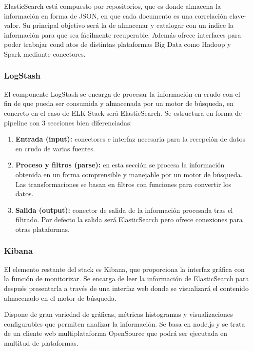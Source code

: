 ElasticSearch está compuesto por repositorios, que es donde almacena la información en forma de JSON, en que cada documento es una correlación clave-valor. Su principal objetivo será la de almacenar y catalogar con un índice la información para que sea fácilmente recuperable. Además ofrece interfaces para poder trabajar cond atos de distintas plataformas Big Data como Hadoop y Spark mediante conectores.

\subsubsection{LogStash}

El componente LogStash  se encarga de procesar la información en crudo con el fin de que pueda ser consumida y almacenada por un motor de búsqueda, en concreto en el caso de ELK Stack será ElasticSearch. Se estructura en forma de pipeline con 3 secciones bien diferenciadas:

\begin{enumerate}
\item \textbf{Entrada (input):} conectores e interfaz necesaria para la recepción de datos en crudo de varias fuentes.
\item \textbf{Proceso y filtros (parse):} en esta sección se procesa la información obtenida en un forma comprensible y manejable por un motor de búsqueda. Las transformaciones se basan en filtros con funciones para convertir los datos.
\item \textbf{Salida (output):} conector de salida de la información procesada tras el filtrado. Por defecto la salida será ElasticSearch pero ofrece conexiones para otras plataformas.
\end{enumerate}

\subsubsection{Kibana}

El elemento restante del stack es Kibana, que proporciona la interfaz gráfica con la función de monitorizar. Se encarga de leer la información de ElasticSearch para después presentarla a través de una interfaz web donde se visualizará el contenido almacenado en el motor de búsqueda.

Dispone de gran variedad de gráficas, métricas histogramas y visualizaciones configurables que permiten analizar la información. Se basa en node.js y se trata de un cliente web multiplataforma OpenSource que podrá ser ejecutada en multitud de plataformas.


